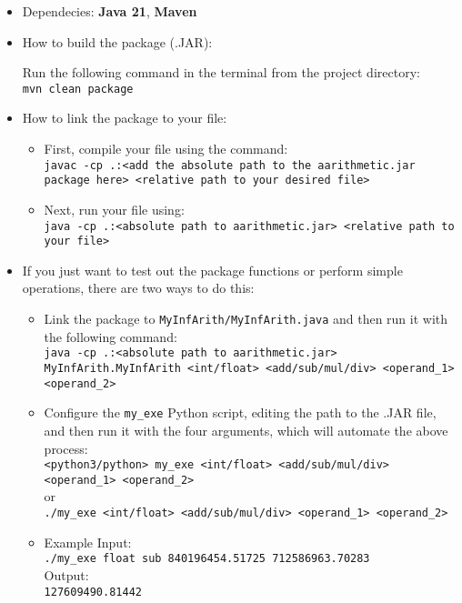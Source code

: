 \documentclass[15pt]{article}
\begin{document}
\begin{itemize}
    \item Dependecies: \textbf{Java 21}, \textbf{Maven}
    \item How to build the package (.JAR):
    
    Run the following command in the terminal from the project directory:\\
    \texttt{mvn clean package}

    \item How to link the package to your file:
    
    \begin{itemize}
        \item First, compile your file using the command:\\
        \texttt{javac -cp .:<add the absolute path to the aarithmetic.jar package here> <relative path to your desired file>}

        \item Next, run your file using:\\
        \texttt{java -cp .:<absolute path to aarithmetic.jar> <relative path to your file>}
    \end{itemize}

    \item If you just want to test out the package functions or perform simple operations, there are two ways to do this:
    \
    \begin{itemize}
        \item Link the package to \texttt{MyInfArith/MyInfArith.java} and then run it with the following command:\\
        \texttt{java -cp .:<absolute path to aarithmetic.jar> MyInfArith.MyInfArith <int/float> <add/sub/mul/div> <operand\_1> <operand\_2>}

        \item Configure the \texttt{my\_exe} Python script, editing the path to the .JAR file, and then run it with the four arguments, which will automate the above process:\\
        \texttt{<python3/python> my\_exe <int/float> <add/sub/mul/div> <operand\_1> <operand\_2>}\\
        or\\
        \texttt{./my\_exe <int/float> <add/sub/mul/div> <operand\_1> <operand\_2>}

        \item Example Input:\\
        \texttt{./my\_exe float sub 840196454.51725 712586963.70283}\\
        Output:\\
        \texttt{127609490.81442}
    \end{itemize}
\end{itemize}
\end{document}
